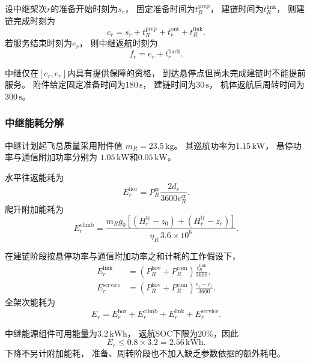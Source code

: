 \documentclass[bwprint]{gmcmthesis}
\begin{document}
设中继架次$r$的准备开始时刻为$s_r$，
固定准备时间为$t_R^{\mathrm{prep}}$，
建链时间为$t_R^{\mathrm{link}}$，
则建链完成时刻为
\begin{equation}
    c_r
    =
    s_r+t_R^{\mathrm{prep}}
    +t_r^{\mathrm{out}}
    +t_R^{\mathrm{link}}.
\end{equation}
若服务结束时刻为$e_r$，
则中继返航时刻为
\begin{equation}
    f_r=e_r+t_r^{\mathrm{back}}.
\end{equation}

中继仅在$[c_r,e_r]$内具有提供保障的资格，
到达悬停点但尚未完成建链时不能提前服务。
附件给定固定准备时间为$180\,\mathrm{s}$，
建链时间为$30\,\mathrm{s}$，
机体返航后周转时间为$300\,\mathrm{s}$。

\subsubsection{中继能耗分解}

中继计划起飞总质量采用附件值
$m_R=23.5\,\mathrm{kg}$。
其巡航功率为$1.15\,\mathrm{kW}$，
悬停功率与通信附加功率分别为
$1.05\,\mathrm{kW}$和$0.05\,\mathrm{kW}$。

水平往返能耗为
\begin{equation}
    E_r^{\mathrm{hor}}
    =
    P_R^{\mathrm{cr}}
    \frac{2d_r}{3600v_R^{\mathrm{cr}}}.
\end{equation}
爬升附加能耗为
\begin{equation}
    E_r^{\mathrm{climb}}
    =
    \frac{
    m_Rg_0
    \left[
    (H_r^{\mathrm{tr}}-z_0)
    +(H_r^{\mathrm{tr}}-z_r)
    \right]
    }{\eta_R\,3.6\times10^6}.
\end{equation}

在建链阶段按悬停功率与通信附加功率之和计耗的工作假设下，
\begin{align}
    E_r^{\mathrm{link}}
    &=
    (P_R^{\mathrm{hov}}+P_R^{\mathrm{com}})
    \frac{t_R^{\mathrm{link}}}{3600},\\
    E_r^{\mathrm{service}}
    &=
    (P_R^{\mathrm{hov}}+P_R^{\mathrm{com}})
    \frac{e_r-c_r}{3600}.
\end{align}
全架次能耗为
\begin{equation}
    E_r
    =
    E_r^{\mathrm{hor}}
    +E_r^{\mathrm{climb}}
    +E_r^{\mathrm{link}}
    +E_r^{\mathrm{service}}.
\end{equation}

中继能源组件可用能量为$3.2\,\mathrm{kWh}$，
返航SOC下限为$20\%$，因此
\begin{equation}
    E_r\leq0.8\times3.2=2.56\,\mathrm{kWh}.
\end{equation}
下降不另计附加能耗，
准备、周转阶段也不加入缺乏参数依据的额外耗电。
\end{document}
